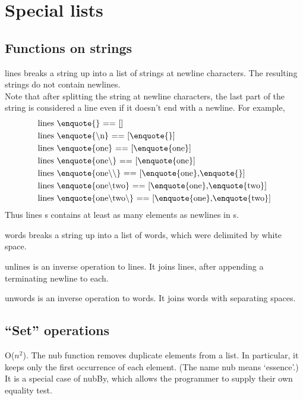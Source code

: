\section{Special lists}
\subsection{Functions on strings}
lines breaks a string up into a list of strings at newline characters. The resulting strings do not contain newlines.\\
Note that after splitting the string at newline characters, the last part of the string is considered a line even if it doesn't end with a newline. For example,
\begin{align*}
	&\text{lines \enquote{} == []}\\
	&\text{lines \enquote{\textbackslash n} == [\enquote{}]}\\
	&\text{lines \enquote{one} == [\enquote{one}]}\\
	&\text{lines \enquote{one\textbackslash } == [\enquote{one}]}\\
	&\text{lines \enquote{one\textbackslash \textbackslash } == [\enquote{one},\enquote{}]}\\
	&\text{lines \enquote{one\textbackslash two} == [\enquote{one},\enquote{two}]}\\
	&\text{lines \enquote{one\textbackslash two\textbackslash } == [\enquote{one},\enquote{two}]}
\end{align*}
Thus lines s contains at least as many elements as newlines in s.

words breaks a string up into a list of words, which were delimited by white space.

unlines is an inverse operation to lines. It joins lines, after appending a terminating newline to each.

unwords is an inverse operation to words. It joins words with separating spaces.

\subsection{\enquote{Set} operations}
O($n^2$). The nub function removes duplicate elements from a list. In particular, it keeps only the first occurrence of each element. (The name nub means `essence'.) It is a special case of nubBy, which allows the programmer to supply their own equality test.

